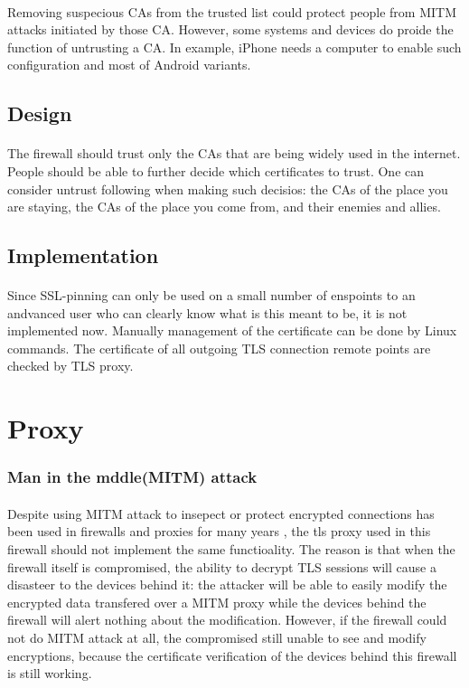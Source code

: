 \documentclass[mscthesis]{usiinfthesis}
\begin{document}
\paragraph{}
Removing suspecious CAs from the trusted list could protect people from MITM attacks initiated by those CA. However, some systems and devices do proide the function of untrusting a CA. In example, iPhone needs a computer to enable such configuration and most of Android variants.
\subsection{Design}
\paragraph{}
The firewall should trust only the CAs that are being widely used in the internet. People should be able to further decide which certificates to trust. One can consider untrust following when making such decisios: the CAs of the place you are staying, the CAs of the place you come from, and their enemies and allies.
\subsection{Implementation}
\paragraph{}
Since SSL-pinning can only be used on a small number of enspoints to an andvanced user who can clearly know what is this meant to be, it is not implemented now. Manually management of the certificate can be done by Linux commands. The certificate of all outgoing TLS connection remote points are checked by TLS proxy.

\section{Proxy}
\subsubsection{Man in the mddle(MITM) attack}
\paragraph{}
Despite using MITM attack to insepect or protect encrypted connections has been used in firewalls and proxies for many years \citep{fortigate:deepinspection}, the tls proxy used in this firewall should not implement the same functioality. The reason is that when the firewall itself is compromised, the ability to decrypt TLS sessions will cause a disasteer to the devices behind it: the attacker will be able to easily modify the encrypted data transfered over a MITM proxy while the devices behind the firewall will alert nothing about the modification. However, if the firewall could not do MITM attack at all, the compromised still unable to see and modify encryptions, because the certificate verification of the devices behind this firewall is still working.
\end{document}
